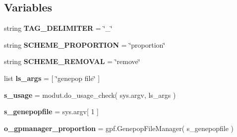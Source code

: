 \subsection*{Variables}
\begin{DoxyCompactItemize}
\item 
string {\bfseries T\+A\+G\+\_\+\+D\+E\+L\+I\+M\+I\+T\+ER} = \char`\"{}\+\_\+\char`\"{}\hypertarget{namespacenegui_1_1genepopfilesampler_a218e2f958da027b600c72bb577a3ff39}{}\label{namespacenegui_1_1genepopfilesampler_a218e2f958da027b600c72bb577a3ff39}

\item 
string {\bfseries S\+C\+H\+E\+M\+E\+\_\+\+P\+R\+O\+P\+O\+R\+T\+I\+ON} = \char`\"{}proportion\char`\"{}\hypertarget{namespacenegui_1_1genepopfilesampler_a08d38d14135ba2b092e3090b0e1e74b1}{}\label{namespacenegui_1_1genepopfilesampler_a08d38d14135ba2b092e3090b0e1e74b1}

\item 
string {\bfseries S\+C\+H\+E\+M\+E\+\_\+\+R\+E\+M\+O\+V\+AL} = \char`\"{}remove\char`\"{}\hypertarget{namespacenegui_1_1genepopfilesampler_a0257c159f203d90380dfed2404ccc3a1}{}\label{namespacenegui_1_1genepopfilesampler_a0257c159f203d90380dfed2404ccc3a1}

\item 
list {\bfseries ls\+\_\+args} = \mbox{[} \char`\"{}genepop file\char`\"{} \mbox{]}\hypertarget{namespacenegui_1_1genepopfilesampler_af0949cf58ac4626034b74cc9feaf35de}{}\label{namespacenegui_1_1genepopfilesampler_af0949cf58ac4626034b74cc9feaf35de}

\item 
{\bfseries s\+\_\+usage} = modut.\+do\+\_\+usage\+\_\+check( sys.\+argv, ls\+\_\+args )\hypertarget{namespacenegui_1_1genepopfilesampler_a50569ca2f7b58beeb1163ff3e3578bc6}{}\label{namespacenegui_1_1genepopfilesampler_a50569ca2f7b58beeb1163ff3e3578bc6}

\item 
{\bfseries s\+\_\+genepopfile} = sys.\+argv\mbox{[} 1 \mbox{]}\hypertarget{namespacenegui_1_1genepopfilesampler_a950ccfdc83d7493167c08843392ce46c}{}\label{namespacenegui_1_1genepopfilesampler_a950ccfdc83d7493167c08843392ce46c}

\item 
{\bfseries o\+\_\+gpmanager\+\_\+proportion} = gpf.\+Genepop\+File\+Manager( s\+\_\+genepopfile )\hypertarget{namespacenegui_1_1genepopfilesampler_abc45a860ba1927aae2c8329de7ca1099}{}\label{namespacenegui_1_1genepopfilesampler_abc45a860ba1927aae2c8329de7ca1099}


\end{DoxyCompactItemize}
